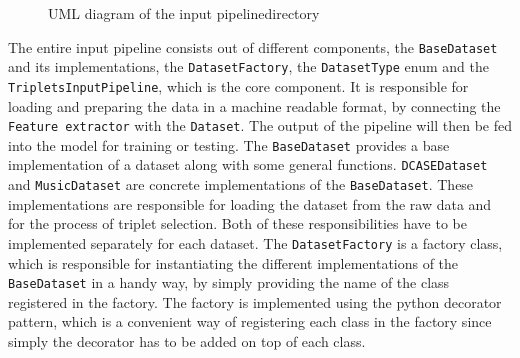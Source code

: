\begin{figure}[htbp]
{
    }
	\caption{UML diagram of the \flqq input pipeline\frqq directory}
	\label{fig:UML-Input-Pipeline}
\end{figure}
\noindent
The entire input pipeline consists out of different components, the \texttt{BaseDataset} and its implementations, the \texttt{DatasetFactory}, the \texttt{DatasetType} enum and the \texttt{TripletsInputPipeline}, which is the core component. It is responsible for loading and preparing the data in a machine readable format, by connecting the \texttt{Feature extractor} with the \texttt{Dataset}. The output of the pipeline will then be fed into the model for training or testing.
\newline
\newline
The \texttt{BaseDataset} provides a base implementation of a dataset along with some general functions. \texttt{DCASEDataset} and \texttt{MusicDataset} are concrete implementations of the \texttt{BaseDataset}. These implementations are responsible for loading the dataset from the raw data and for the process of triplet selection. Both of these responsibilities have to be implemented separately for each dataset. The \texttt{DatasetFactory} is a factory class, which is responsible for instantiating the different implementations of the \texttt{BaseDataset} in a handy way, by simply providing the name of the class registered in the factory. The factory is implemented using the python decorator pattern, which is a convenient way of registering each class in the factory since simply the decorator has to be added on top of each class.
